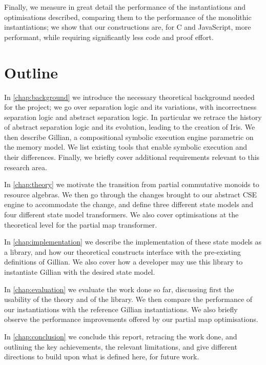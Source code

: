 Finally, we measure in great detail the performance of the instantiations and optimisations described, comparing them to the performance of the monolithic instantiations; we show that our constructions are, for C and JavaScript, more performant, while requiring significantly less code and proof effort.

\section{Outline}

In \autoref{chap:background} we introduce the necessary theoretical background needed for the project; we go over separation logic and its variations, with incorrectness separation logic and abstract separation logic. In particular we retrace the history of abstract separation logic and its evolution, leading to the creation of Iris. We then describe Gillian, a compositional symbolic execution engine parametric on the memory model. We list existing tools that enable symbolic execution and their differences. Finally, we briefly cover additional requirements relevant to this research area.

In \autoref{chap:theory} we motivate the transition from partial commutative monoids to resource algebras. We then go through the changes brought to our abstract CSE engine to accommodate the change, and define three different state models and four different state model transformers. We also cover optimisations at the theoretical level for the partial map transformer.

In \autoref{chap:implementation} we describe the implementation of these state models as a library, and how our theoretical constructs interface with the pre-existing definitions of Gillian. We also cover how a developer may use this library to instantiate Gillian with the desired state model.

In \autoref{chap:evaluation} we evaluate the work done so far, discussing first the usability of the theory and of the library. We then compare the performance of our instantiations with the reference Gillian instantiations. We also briefly observe the performance improvements offered by our partial map optimisations.

In \autoref{chap:conclusion} we conclude this report, retracing the work done, and outlining the key achievements, the relevant limitations, and give different directions to build upon what is defined here, for future work.
